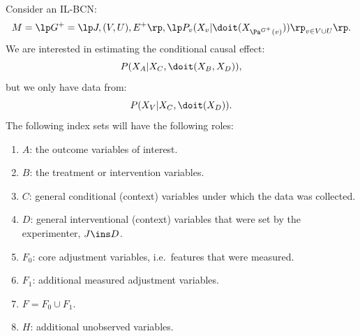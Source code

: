 \begin{Not}
Consider an IL-BCN:
        \[M= \lp G^+=\lp J,(V,U),E^+ \rp, \lp P_v ( X_v|\doit( X_{\Pa^{G^+}(v)})) \rp_{v \in V \cup U} \rp.\]
We are interested in estimating the conditional causal effect:
\[ P(X_A|X_C,\doit(X_B,X_D)), \]
but we only have data from:
\[ P(X_V|X_C,\doit(X_D)). \]
The following index sets will have the following roles:
\begin{enumerate}
    \item $A$: the outcome variables of interest.
    \item $B$: the treatment or intervention variables.
    \item $C$: general conditional (context) variables under which the data was collected.
    \item $D$: general interventional (context) variables that were set by the experimenter, $J \ins D$.
    \item $F_0$: core adjustment variables, i.e.\ features that were measured.
    \item $F_1$: additional measured adjustment variables.
    \item $F = F_0 \cup F_1$.
    \item $H$: additional unobserved variables.
\end{enumerate}


\end{Not}


